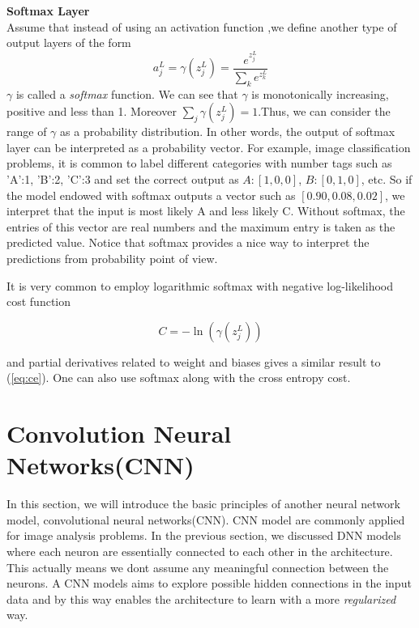 \documentclass[12pt]{article}
\begin{document}
\begin{flushleft}
\textbf{Softmax Layer} \\
Assume that instead of using an activation function ,we define another type of output layers of the form
\begin{equation}
a_{j}^{L} = \gamma(z_{j}^{L}) =  \dfrac{e^{z_{j}^{L}}}{\sum_{k}e^{z_{k}^{L}}}
\end{equation}
$\gamma$ is called a \textit{softmax} function. We can see that $\gamma$ is monotonically increasing, positive and less than 1. Moreover $\sum_{j}\gamma(z_{j}^{L})=1$.Thus, we can consider the range of $\gamma$ as a probability distribution. In other words, the output of softmax layer can be interpreted as a probability vector. For example, image classification problems, it is common to label different categories with number tags such as 'A':1, 'B':2, 'C':3  and set the correct output as $A:[1,0,0]$, $B:[0,1,0]$, etc. So if the model endowed with softmax outputs a vector such as $[0.90,0.08,0.02]$, we interpret that the input is most likely A and less likely C. Without softmax, the entries of this vector are real numbers and the maximum entry is taken as the predicted value. Notice that softmax provides a nice way to interpret the predictions from probability point of view. 

It is very common to employ logarithmic softmax with negative log-likelihood cost function 

\begin{equation}
C = -\ln(\gamma(z_{j}^{L}))
\end{equation} 

and partial derivatives related to weight and biases gives a similar result to (\ref{eq:ce}). One can also use softmax along with the cross entropy cost.
\end{flushleft}







\section{Convolution Neural Networks(CNN)}
\label{CNN}

In this section, we will introduce the basic principles of another neural network model, convolutional neural networks(CNN). CNN model are commonly applied for image analysis problems. In the previous section, we discussed DNN models where each neuron are essentially connected to each other in the architecture. This actually means we dont assume any meaningful connection between the neurons. A CNN models aims to explore possible hidden connections in the input data and by this way enables the architecture to learn with a more \textit{regularized} way. 
\end{document}
